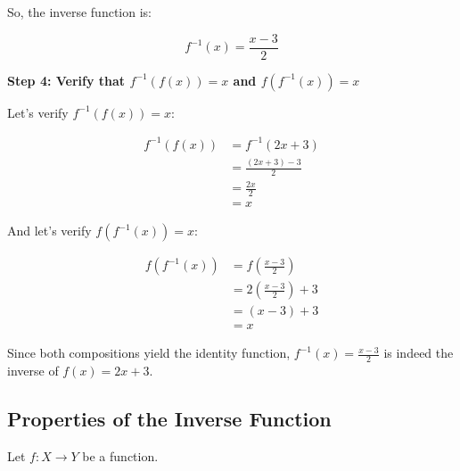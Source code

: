 So, the inverse function is:

\[
	f^{-1}(x) = \frac{x - 3}{2}
\]

\textbf{Step 4: Verify that \(f^{-1} (f (x)) = x\) and \(f(f^{-1} (x)) = x\)}

Let's verify \(f^{-1} (f (x)) = x\):

\begin{align*}
	f^{-1}(f(x)) & = f^{-1}(2x + 3)         \\
	             & = \frac{(2x + 3) - 3}{2} \\
	             & = \frac{2x}{2}           \\
	             & = x
\end{align*}

And let's verify \(f(f^{-1}(x)) = x\):

\begin{align*}
	f(f^{-1}(x)) & = f\left(\frac{x - 3}{2}\right)     \\
	             & = 2\left(\frac{x - 3}{2}\right) + 3 \\
	             & = (x - 3) + 3                       \\
	             & = x
\end{align*}

Since both compositions yield the identity function, \(f^{-1} (x) = \frac{x - 3}{2}\) is indeed the 
inverse of \(f (x) = 2x + 3\).

\subsection{Properties of the Inverse Function}

Let \(f: X \to Y\) be a function.

